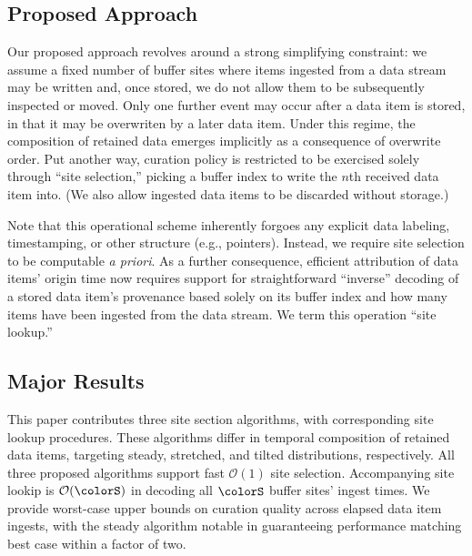 \subsection{Proposed Approach}


Our proposed approach revolves around a strong simplifying constraint: we assume a fixed number of buffer sites where items ingested from a data stream may be written and, once stored, we do not allow them to be subsequently inspected or moved.
Only one further event may occur after a data item is stored, in that it may be overwriten by a later data item.
Under this regime, the composition of retained data emerges implicitly as a consequence of overwrite order.
Put another way, curation policy is restricted to be exercised solely through ``site selection,'' picking a buffer index to write the $n$th received data item into.
(We also allow ingested data items to be discarded without storage.)

Note that this operational scheme inherently forgoes any explicit data labeling, timestamping, or other structure (e.g., pointers).
Instead, we require site selection to be computable \textit{a priori}.
As a further consequence, efficient attribution of data items' origin time now requires support for straightforward ``inverse'' decoding of a stored data item's provenance based solely on its buffer index and how many items have been ingested from the data stream.
We term this operation ``site lookup.''

\subsection{Major Results}

This paper contributes three site section algorithms, with corresponding site lookup procedures.
These algorithms differ in temporal composition of retained data items, targeting steady, stretched, and tilted distributions, respectively.
All three proposed algorithms support fast $\mathcal{O}(1)$ site selection.
Accompanying site lookip is $\mathcal{O}(\colorS)$ in decoding all $\colorS$ buffer sites' ingest times.
We provide worst-case upper bounds on curation quality across elapsed data item ingests, with the steady algorithm notable in guaranteeing performance matching best case within a factor of two.
